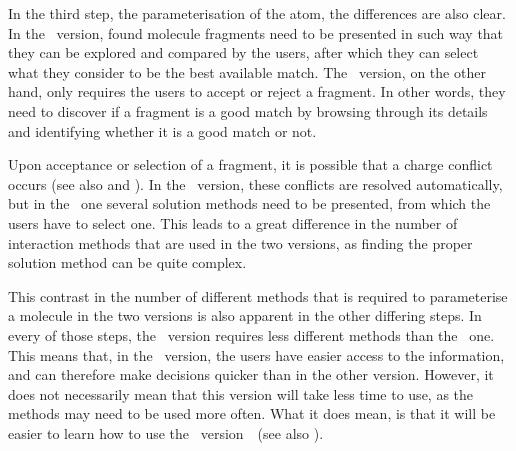 In the third step, the parameterisation of the atom, the differences are also clear. In the \IDa\ version, found molecule fragments need to be presented in such way that they can be explored and compared by the users, after which they can select what they consider to be the best available match. The \IDb\ version, on the other hand, only requires the users to accept or reject a fragment. In other words, they need to discover if a fragment is a good match by browsing through its details and identifying whether it is a good match or not.

Upon acceptance or selection of a fragment, it is possible that a charge conflict occurs (see also  and ). In the \IDb\ version, these conflicts are resolved automatically, but in the \IDa\ one several solution methods need to be presented, from which the users have to select one. This leads to a great difference in the number of interaction methods that are used in the two versions, as finding the proper solution method can be quite complex.

This contrast in the number of different methods that is required to parameterise a molecule in the two versions is also apparent in the other differing steps. In every of those steps, the \IDb\ version requires less different methods than the \IDa\ one. This means that, in the \IDb\ version, the users have easier access to the information, and can therefore make decisions quicker than in the other version. However, it does not necessarily mean that this version will take less time to use, as the methods may need to be used more often. What it does mean, is that it will be easier to learn how to use the \IDb\ version~\cite{sweller1994cognitive}~(see also ).
